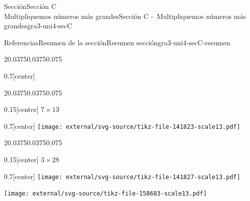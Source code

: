 \begin{sectionptx}{Sección}{{\Large Sección C\\}Multipliquemos números más grandes}{}{Sección C -~Multipliquemos números más grandes}{}{}{gra3-uni4-secC}
\begin{references-subsection}{Referencias}{Resumen de la sección}{}{Resumen sección}{}{}{gra3-uni4-secC-resumen}
\begin{sidebyside}{2}{0.0375}{0.0375}{0.075}
\begin{sbspanel}{0.7}[center]
\end{sbspanel}%
\end{sidebyside}%
\begin{sidebyside}{2}{0.0375}{0.0375}{0.075}%
\begin{sbspanel}{0.15}[center]%
\(7\times 13\)%
\end{sbspanel}%
\begin{sbspanel}{0.7}[center]%
\texttt{[image: external/svg-source/tikz-file-141823-scale13.pdf]}
\end{sbspanel}%
\end{sidebyside}%
\begin{sidebyside}{2}{0.0375}{0.0375}{0.075}%
\begin{sbspanel}{0.15}[center]%
\(3\times 28\)%
\end{sbspanel}%
\begin{sbspanel}{0.7}[center]%
\texttt{[image: external/svg-source/tikz-file-141827-scale13.pdf]}
\par
\texttt{[image: external/svg-source/tikz-file-158683-scale13.pdf]}
\end{sbspanel}%
\end{sidebyside}%
\end{references-subsection}
\end{sectionptx}
%
%
\typeout{************************************************}
\typeout{************************************************}
%
